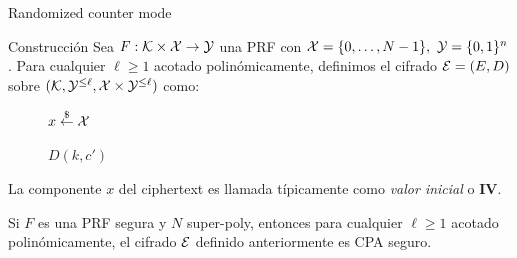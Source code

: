 \begin{frame}[allowframebreaks]{Randomized counter mode}
  \begin{block}{Construcción}
    Sea $F: \mathcal{K} \times \mathcal{X} \to \mathcal{Y}$ una PRF con $\mathcal{X} = \{0, \dots, N-1\},\ \mathcal{Y} = \{0, 1\}^n$.
    Para cualquier $\ell \geq 1$ acotado polinómicamente, definimos el cifrado $\mathcal{E} = (E, D)$
    sobre $(\mathcal{K}, \mathcal{Y}^{\leq\ell}, \mathcal{X} \times \mathcal{Y}^{\leq\ell})$ como:
    \begin{figure}[h]
      \centering
      \begin{minipage}{0.48\textwidth}
        \begin{algorithm}[H]
          \DontPrintSemicolon
          \footnotesize
          \caption{$E(k, m)$}
          $x \overset{\$}{\leftarrow} \mathcal{X}$\;
        \end{algorithm}
      \end{minipage}
      \hfill
      \begin{minipage}{0.48\textwidth}
        \begin{algorithm}[H]
          \DontPrintSemicolon
          \footnotesize
          \caption{$D(k, c')$}
        \end{algorithm}
      \end{minipage}
    \end{figure}
  \end{block}
  La componente $x$ del ciphertext es llamada típicamente como \textit{valor inicial} 
  o $\textbf{IV}$.

  \begin{theorem}
    Si $F$ es una PRF segura y $N$ super-poly, entonces para cualquier $\ell \geq 1$ acotado 
    polinómicamente, el cifrado $\mathcal{E}$ definido anteriormente es CPA seguro.


\end{theorem}
\end{frame}
